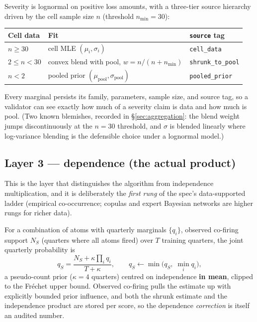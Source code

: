 \documentclass[11pt]{article}
\begin{document}
Severity is lognormal on positive loss amounts, with a three-tier source
hierarchy driven by the cell sample size $n$ (threshold $n_{\min} = 30$):

\begin{center}\small
\begin{tabular}{@{}lll@{}}
\toprule
Cell data & Fit & \texttt{source} tag \\
\midrule
$n \ge 30$ & cell MLE $(\mu_i, \sigma_i)$ & \texttt{cell\_data} \\
$2 \le n < 30$ & convex blend with pool, $w = n/(n+n_{\min})$ & \texttt{shrunk\_to\_pool} \\
$n < 2$ & pooled prior $(\mu_{\mathrm{pool}}, \sigma_{\mathrm{pool}})$ & \texttt{pooled\_prior} \\
\bottomrule
\end{tabular}
\end{center}

Every marginal persists its family, parameters, sample size, and source tag,
so a validator can see exactly how much of a severity claim is data and how
much is pool. (Two known blemishes, recorded in \S\ref{sec:aggregation}: the
blend weight jumps discontinuously at the $n = 30$ threshold, and $\sigma$
is blended linearly where log-variance blending is the defensible choice
under a lognormal model.)

\subsection{Layer 3 --- dependence (the actual product)}
\label{sec:dependence}

This is the layer that distinguishes the algorithm from independence
multiplication, and it is deliberately the \emph{first rung} of the spec's
data-supported ladder (empirical co-occurrence; copulas and expert Bayesian
networks are higher rungs for richer data).

For a combination of atoms with quarterly marginals $\{q_i\}$, observed
co-firing support $N_S$ (quarters where all atoms fired) over $T$ training
quarters, the joint quarterly probability is
\[
q_S = \frac{N_S + \kappa \prod_i q_i}{T + \kappa},
\qquad
q_S \leftarrow \min\!\big(q_S,\; \min_i q_i\big),
\]
a pseudo-count prior ($\kappa = 4$ quarters) centred on independence
\textbf{in mean}, clipped to the Fr\'echet upper bound. Observed co-firing
pulls the estimate up with explicitly bounded prior influence, and both the
shrunk estimate and the independence product are stored per score, so the
dependence \emph{correction} is itself an audited number.
\end{document}
